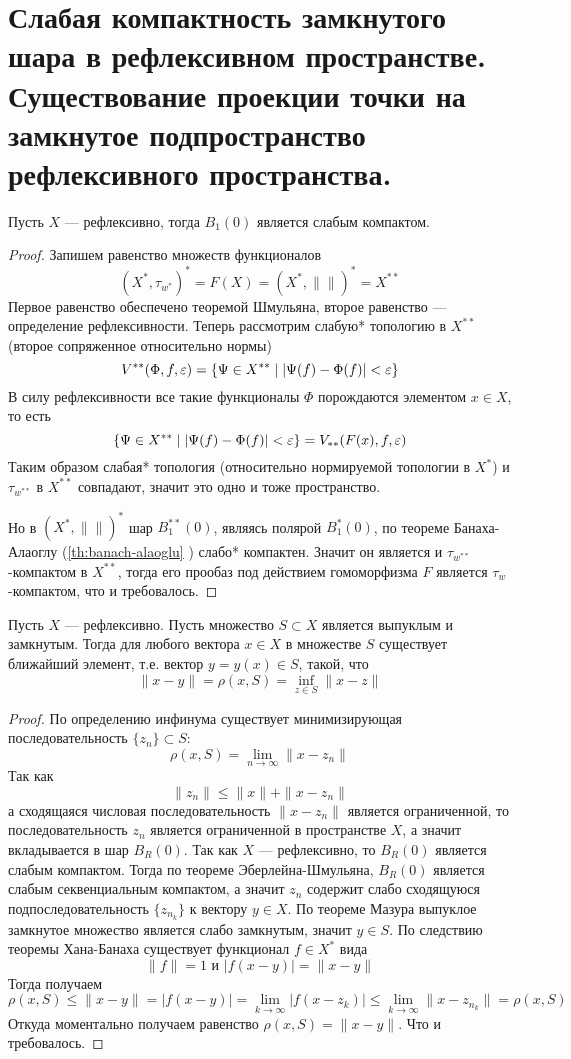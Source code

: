 \newpage
\section{Слабая компактность замкнутого шара в рефлексивном пространстве. Существование проекции точки на замкнутое подпространство рефлексивного пространства.}
\begin{theorem}
	Пусть $X$ --- рефлексивно, тогда $B_1(0)$ является слабым компактом.
\end{theorem}
\begin{proof}
	Запишем равенство множеств функционалов
	$$
	(X^*, \tau_{w^*})^* = F(X) = (X^*, \|\|)^* = X^{**}
	$$
	Первое равенство обеспечено теоремой Шмульяна, второе равенство --- определение рефлексивности. Теперь рассмотрим слабую* топологию в $X^{**}$ (второе сопряженное относительно нормы)
	$$
	V^{**}(\Phi, f, \varepsilon) = \{\Psi \in X^{**} \mid |\Psi(f) - \Phi(f)| < \varepsilon\}
	$$
	В силу рефлексивности все такие функционалы $\Phi$ порождаются элементом $x \in X$, то есть 
	$$
	\{\Psi \in X^{**} \mid |\Psi(f) - \Phi(f)| < \varepsilon\} = V_{**}(F(x), f, \varepsilon)
	$$
	Таким образом слабая* топология (относительно нормируемой топологии в $X^*$) и $\tau_{w^{**}}$ в $X^{**}$ совпадают, значит это одно и тоже пространство. 
	
	Но в $(X^*, \|\|)^*$ шар $B^{**}_1(0)$, являясь полярой $B^{*}_1(0)$, по теореме Банаха-Алаоглу (\ref{th:banach-alaoglu} ) слабо* компактен. Значит он является и $\tau_{w^{**}}$-компактом в $X^{**}$, тогда его прообаз под действием гомоморфизма $F$ является $\tau_w$-компактом, что и требовалось.
\end{proof}

\begin{claim}
	Пусть $X$ --- рефлексивно. Пусть множество $S \subset X$ является выпуклым и замкнутым. Тогда для любого вектора $x \in X$ в множестве $S$ существует ближайший элемент, т.е. вектор $y = y(x) \in S$, такой, что 
	$$
	\|x-y\| = \rho(x,S) = \inf\limits_{z \in S} \|x - z\|
	$$
\end{claim}
\begin{proof}
	По определению инфинума существует минимизирующая последовательность $\{z_n\} \subset S$: 
	$$
	\rho(x,S) = \lim\limits_{n \to \infty} \|x - z_n\|
	$$
	Так как 
	$$
	\|z_n\| \leq \|x\| + \|x - z_n\|
	$$
	а сходящаяся числовая последовательность $\|x-z_n\|$ является ограниченной, то последовательность $z_n$ является ограниченной в пространстве $X$, а значит вкладывается в шар $B_R(0)$. Так как $X$ --- рефлексивно, то $B_R(0)$ является слабым компактом. Тогда по теореме Эберлейна-Шмульяна, $B_R(0)$ является слабым секвенциальным компактом, а значит ${z_n}$ содержит слабо сходящуюся подпоследовательность $\{z_{n_k}\}$ к вектору $y \in X$. По теореме Мазура выпуклое замкнутое множество является слабо замкнутым, значит $y \in S$. По следствию теоремы Хана-Банаха существует функционал $f \in X^*$ вида 
	$$
	\|f\| = 1 \text{ и } |f(x-y)| = \|x-y\|
	$$
	Тогда получаем
	$$
	\rho(x,S) \leq \|x-y\| = |f(x-y)| = \lim\limits_{k\to \infty} |f(x - z_k)| \leq \lim\limits_{k\to\infty} \|x-z_{n_k}\| = \rho(x,S)
	$$
	Откуда моментально получаем равенство $\rho(x,S)  = \|x - y\|$. Что и требовалось.
\end{proof}

